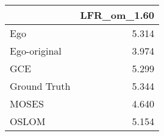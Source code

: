 \begin{tabular}{lr}
\toprule
{} & LFR_om_1.60 \\
\midrule
Ego          &       5.314 \\
Ego-original &       3.974 \\
GCE          &       5.299 \\
Ground Truth &       5.344 \\
MOSES        &       4.640 \\
OSLOM        &       5.154 \\
\bottomrule
\end{tabular}
